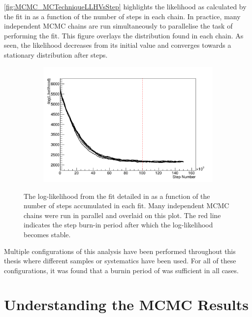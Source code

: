 \autoref{fig:MCMC_MCTechniqueLLHVsStep} highlights the likelihood as calculated by the fit in  as a function of the number of steps in each chain. In practice, many independent MCMC chains are run simultaneously to parallelise the task of performing the fit. This figure overlays the distribution found in each chain. As seen, the likelihood decreases from its initial value and converges towards a stationary distribution after  steps.

\begin{figure}[h]
  \begin{subfigure}[t]{0.8\textwidth}
    \includegraphics[width=\textwidth, trim={0mm 0mm 0mm 0mm}, clip,page=1]{Figures/MCMC/MCTechnique_LLHStep.pdf}
  \end{subfigure}
  \caption{The log-likelihood from the fit detailed in  as a function of the number of steps accumulated in each fit. Many independent MCMC chains were run in parallel and overlaid on this plot. The red line indicates the  step burn-in period after which the log-likelihood becomes stable.}
  \label{fig:MCMC_MCTechniqueLLHVsStep}
\end{figure}

Multiple configurations of this analysis have been performed throughout this thesis where different samples or systematics have been used. For all of these configurations, it was found that a burnin period of  was sufficient in all cases.

\section{Understanding the MCMC Results}
\label{sec:MarkovChainMonteCarlo_UnderstandingMCMCResults}

